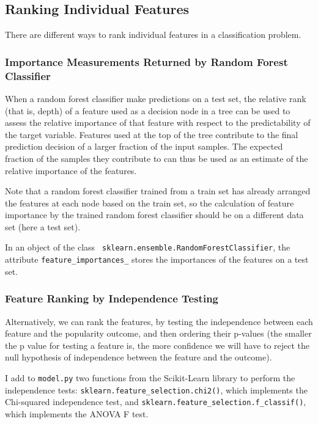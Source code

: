 \documentclass[preprint, 12pt]{elsarticle}
\begin{document}
\subsection{Ranking Individual Features}

There are different ways to rank individual features in a classification problem.


\subsubsection{Importance Measurements Returned by Random Forest Classifier}

When a random forest classifier make predictions on a test set,
the relative rank (that is, depth) of a feature used as a decision node in a tree can be used to assess the relative importance of that feature with respect to the predictability of the target variable. Features used at the top of the tree contribute to the final prediction decision of a larger fraction of the input samples. The expected fraction of the samples they contribute to can thus be used as an estimate of the relative importance of the features. \cite{web:slguide}

Note that a random forest classifier trained from a train set has already arranged the features at each node based on the train set, so the calculation of feature importance by the trained random forest classifier should be on a different data set (here a test set).

In an object of the class \verb| sklearn.ensemble.RandomForestClassifier|, the attribute \verb|feature_importances_| stores the importances of the features on a test set.

\subsubsection{Feature Ranking by Independence Testing}

Alternatively, we can rank the features, by testing the independence between each feature and the popularity outcome, and then ordering their p-values (the smaller the p value for testing a feature is, the more confidence we will have to reject the null hypothesis of independence between the feature and the outcome).

I add to \verb|model.py| two functions from the Scikit-Learn library to perform the independence tests:
 \verb|sklearn.feature_selection.chi2()|, which implements the Chi-squared independence test, and \verb|sklearn.feature_selection.f_classif()|, which implements the ANOVA F test.
\end{document}
